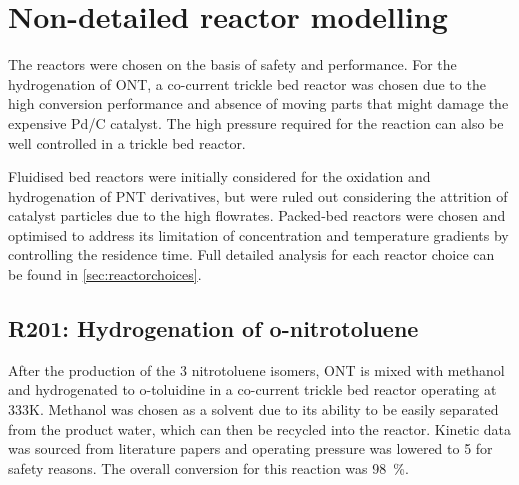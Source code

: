 \section{Non-detailed reactor modelling} \label{Non-detailed}

The reactors were chosen on the basis of safety and performance. For the hydrogenation of ONT, a co-current trickle bed reactor was chosen due to the high conversion performance and absence of moving parts that might damage the expensive Pd/C catalyst. The high pressure required for the reaction can also be well controlled in a trickle bed reactor. 

Fluidised bed reactors were initially considered for the oxidation and hydrogenation of PNT derivatives, but were ruled out considering the attrition of catalyst particles due to the high flowrates. Packed-bed reactors were chosen and optimised to address its limitation of concentration and temperature gradients by controlling the residence time. Full detailed analysis for each reactor choice can be found in \cref{sec:reactorchoices}.

\begin{table}[h]
\centering
\caption{Summary of non-detailed reactors}
\label{tab:nondetailedtable}
\end{table}

\subsection{R201: Hydrogenation of o-nitrotoluene}
After the production of the 3 nitrotoluene isomers, ONT is mixed with methanol and hydrogenated to o-toluidine in a co-current trickle bed reactor operating at 333K. Methanol was chosen as a solvent due to its ability to be easily separated from the product water, which can then be recycled into the reactor. Kinetic data was sourced from literature papers \cite{rajadhyaksha_solvent_1986} and operating pressure was lowered to \SI{5}{\atm} for safety reasons. The overall conversion for this reaction was \SI{98}{\%}.


